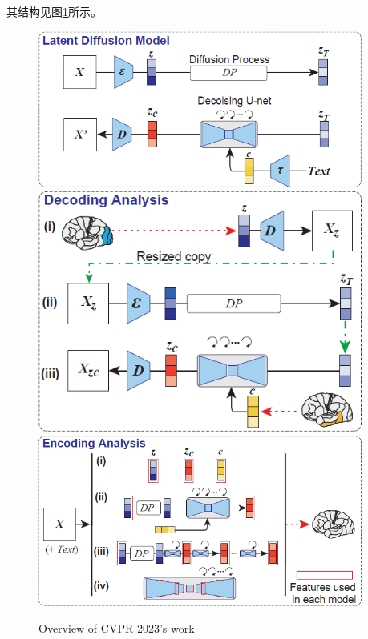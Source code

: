 \documentclass[12pt, a4paper, oneside]{ctexart}
\begin{document}
    其结构见图\ref{overview_cvpr2023}所示。

    \begin{figure}[ptbp]
        \centering
        \includegraphics[width=0.95\textwidth]{pic/4.1_latent diffusion model.png}
        \centering
        \includegraphics[width=0.95\textwidth]{pic/4.1_decoding analysis.png}
        \centering
        \includegraphics[width=0.95\textwidth]{pic/4.1_encoding analysis.png}
        \caption{Overview of CVPR 2023's work}
        \label{overview_cvpr2023}
    \end{figure}
\end{document}

